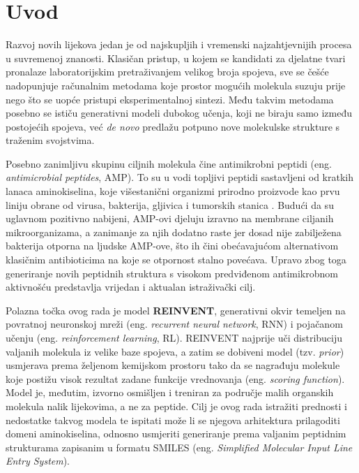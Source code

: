 \chapter{Uvod}
\label{ch:uvod}

Razvoj novih lijekova jedan je od najskupljih i vremenski najzahtjevnijih
procesa u suvremenoj znanosti. Klasičan pristup, u kojem se kandidati za
djelatne tvari pronalaze laboratorijskim pretraživanjem velikog broja
spojeva, sve se češće nadopunjuje računalnim metodama koje prostor mogućih
molekula suzuju prije nego što se uopće pristupi eksperimentalnoj sintezi.
Među takvim metodama posebno se ističu generativni modeli dubokog učenja,
koji ne biraju samo između postojećih spojeva, već \emph{de novo} predlažu
potpuno nove molekulske strukture s traženim svojstvima.

Posebno zanimljivu skupinu ciljnih molekula čine antimikrobni peptidi
(eng. \emph{antimicrobial peptides}, AMP). To su u vodi topljivi peptidi
sastavljeni od kratkih lanaca aminokiselina, koje višestanični organizmi
prirodno proizvode kao prvu liniju obrane od virusa, bakterija, gljivica i
tumorskih stanica \cite{negovetic2022}. Budući da su uglavnom pozitivno
nabijeni, AMP-ovi djeluju izravno na membrane ciljanih mikroorganizama, a
zanimanje za njih dodatno raste jer dosad nije zabilježena bakterija
otporna na ljudske AMP-ove, što ih čini obećavajućom alternativom
klasičnim antibioticima na koje se otpornost stalno povećava. Upravo zbog
toga generiranje novih peptidnih struktura s visokom predviđenom
antimikrobnom aktivnošću predstavlja vrijedan i aktualan istraživački cilj.

Polazna točka ovog rada je model \textbf{REINVENT}, generativni okvir
temeljen na povratnoj neuronskoj mreži (eng. \emph{recurrent neural
network}, RNN) i pojačanom učenju (eng. \emph{reinforcement learning}, RL).
REINVENT najprije uči distribuciju valjanih molekula iz velike baze
spojeva, a zatim se dobiveni model (tzv. \emph{prior}) usmjerava prema
željenom kemijskom prostoru tako da se nagrađuju molekule koje postižu
visok rezultat zadane funkcije vrednovanja (eng. \emph{scoring function}).
Model je, međutim, izvorno osmišljen i treniran za područje malih organskih
molekula nalik lijekovima, a ne za peptide. Cilj je ovog rada istražiti
prednosti i nedostatke takvog modela te ispitati može li se njegova
arhitektura prilagoditi domeni aminokiselina, odnosno usmjeriti generiranje
prema valjanim peptidnim strukturama zapisanim u formatu SMILES
(eng. \emph{Simplified Molecular Input Line Entry System}).

